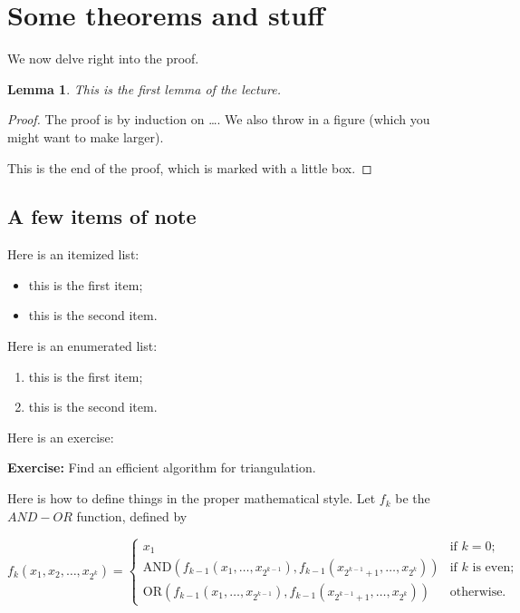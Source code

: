 \documentclass{article}
\newcounter{lecnum}
\newcommand{\fig}[4]{
			\begin{center}
	                \texttt{[image: \#3]} \\
			Figure \thelecnum.#1:~#2
			\end{center}
	}
\newtheorem{lemma}[theorem]{Lemma}
\begin{document}
\section{Some theorems and stuff} %

We now delve right into the proof.

\begin{lemma}
This is the first lemma of the lecture.
\end{lemma}

\begin{proof}
The proof is by induction on \ldots.
We also throw in a figure (which you might want to make larger).


This is the end of the proof, which is marked with a little box.
\end{proof}

\subsection{A few items of note}

Here is an itemized list:
\begin{itemize}
\item this is the first item;
\item this is the second item.
\end{itemize}
Here is an enumerated list:
\begin{enumerate}
\item this is the first item;
\item this is the second item.
\end{enumerate}

Here is an exercise:

{\bf Exercise:}  Find an efficient algorithm for triangulation.

Here is how to define things in the proper mathematical style.
Let $f_k$ be the $AND-OR$ function, defined by

\[ f_k(x_1, x_2, \ldots, x_{2^k}) = \left\{ \begin{array}{ll}

	x_1 & \mbox{if $k = 0$;} \\

	\mbox{AND}(f_{k-1}(x_1, \ldots, x_{2^{k-1}}),
	   f_{k-1}(x_{2^{k-1} + 1}, \ldots, x_{2^k}))
	 & \mbox{if $k$ is even;} \\

	\mbox{OR}(f_{k-1}(x_1, \ldots, x_{2^{k-1}}),
	   f_{k-1}(x_{2^{k-1} + 1}, \ldots, x_{2^k}))	
	& \mbox{otherwise.} 
	\end{array}
	\right. \]
\end{document}
